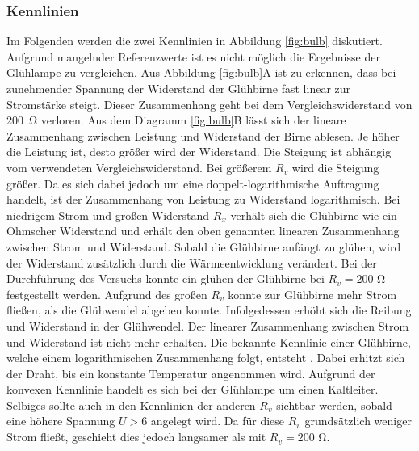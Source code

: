 \documentclass[a4paper,usenatbib]{aspdoc}
\begin{document}
            \subsubsection{Kennlinien}
                Im Folgenden werden die zwei Kennlinien in Abbildung \ref{fig:bulb} diskutiert. Aufgrund mangelnder Referenzwerte ist es nicht möglich die Ergebnisse der Glühlampe zu vergleichen. Aus Abbildung \ref{fig:bulb}A ist zu erkennen, dass bei zunehmender Spannung der Widerstand der Glühbirne fast linear zur Stromstärke steigt. Dieser Zusammenhang geht bei dem Vergleichswiderstand von \SI{200}{\ohm} verloren.
                Aus dem Diagramm \ref{fig:bulb}B lässt sich der lineare Zusammenhang zwischen Leistung und Widerstand der Birne ablesen. Je höher die Leistung ist, desto größer wird der Widerstand. Die Steigung ist abhängig vom verwendeten Vergleichswiderstand. Bei größerem $R_v$ wird die Steigung größer. Da es sich dabei jedoch um eine doppelt-logarithmische Auftragung handelt, ist der Zusammenhang von Leistung zu Widerstand logarithmisch. Bei niedrigem Strom und großen Widerstand $R_x$ verhält sich die Glühbirne wie ein Ohmscher Widerstand und erhält den oben genannten linearen Zusammenhang zwischen Strom und Widerstand. Sobald die Glühbirne anfängt zu glühen, wird der Widerstand zusätzlich durch die Wärmeentwicklung verändert. Bei der Durchführung des Versuchs konnte ein glühen der Glühbirne bei $R_v = 200$ \si{\ohm} festgestellt werden. Aufgrund des großen $R_v$ konnte zur Glühbirne mehr Strom fließen, als die Glühwendel abgeben konnte. Infolgedessen erhöht sich die Reibung und Widerstand in der Glühwendel. Der linearer Zusammenhang zwischen Strom und Widerstand ist nicht mehr erhalten. Die bekannte Kennlinie einer Glühbirne, welche einem logarithmischen Zusammenhang folgt, entsteht \citep{tipler}. Dabei erhitzt sich der Draht, bis ein konstante Temperatur angenommen wird. Aufgrund der konvexen Kennlinie handelt es sich bei der Glühlampe um einen Kaltleiter. Selbiges sollte auch in den Kennlinien der anderen $R_v$ sichtbar werden, sobald eine höhere Spannung $U > 6$ angelegt wird. Da für diese $R_v$ grundsätzlich weniger Strom fließt, geschieht dies jedoch langsamer als mit $R_v = 200$ \si{\ohm}.  
                
        
        
\end{document}
